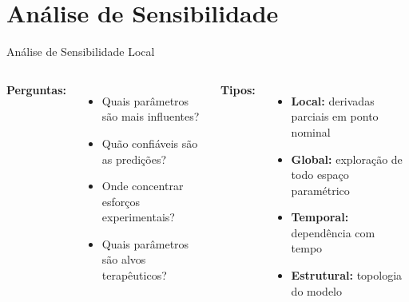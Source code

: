 \section{Análise de Sensibilidade}

\begin{frame}[allowframebreaks]{Análise de Sensibilidade Local}

\vspace{0.3cm}

\begin{columns}
\textbf{Perguntas:}
\begin{itemize}
    \item Quais parâmetros são mais influentes?
    \item Quão confiáveis são as predições?
    \item Onde concentrar esforços experimentais?
    \item Quais parâmetros são alvos terapêuticos?
\end{itemize}

\textbf{Tipos:}
\begin{itemize}
    \item \textbf{Local:} derivadas parciais em ponto nominal
    \item \textbf{Global:} exploração de todo espaço paramétrico
    \item \textbf{Temporal:} dependência com tempo
    \item \textbf{Estrutural:} topologia do modelo
\end{itemize}
\end{columns}
\end{frame}

